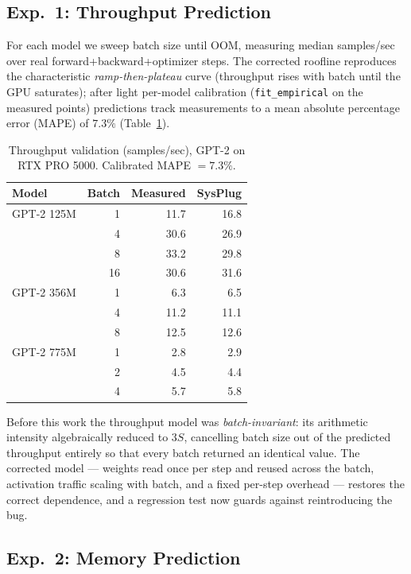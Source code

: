 \documentclass[10pt,twocolumn]{article}
\begin{document}
\subsection{Exp.\ 1: Throughput Prediction}

For each model we sweep batch size until OOM, measuring median samples/sec over
real forward+backward+optimizer steps. The corrected roofline reproduces the
characteristic \emph{ramp-then-plateau} curve (throughput rises with batch until
the GPU saturates); after light per-model calibration (\texttt{fit\_empirical}
on the measured points) predictions track measurements to a mean absolute
percentage error (MAPE) of $7.3\%$ (Table~\ref{tab:tput}).

\begin{table}[h]
\centering
\caption{Throughput validation (samples/sec), GPT-2 on RTX PRO 5000.
Calibrated MAPE $=7.3\%$.}
\label{tab:tput}
\begin{tabular}{lrrr}
\toprule
Model & Batch & Measured & SysPlug \\
\midrule
GPT-2 125M & 1  & 11.7 & 16.8 \\
           & 4  & 30.6 & 26.9 \\
           & 8  & 33.2 & 29.8 \\
           & 16 & 30.6 & 31.6 \\
GPT-2 356M & 1  & 6.3  & 6.5  \\
           & 4  & 11.2 & 11.1 \\
           & 8  & 12.5 & 12.6 \\
GPT-2 775M & 1  & 2.8  & 2.9  \\
           & 2  & 4.5  & 4.4  \\
           & 4  & 5.7  & 5.8  \\
\bottomrule
\end{tabular}
\end{table}

Before this work the throughput model was \emph{batch-invariant}: its arithmetic
intensity algebraically reduced to $3S$, cancelling batch size out of the
predicted throughput entirely so that every batch returned an identical value.
The corrected model --- weights read once per step and reused across the batch,
activation traffic scaling with batch, and a fixed per-step overhead ---
restores the correct dependence, and a regression test now guards against
reintroducing the bug.

\subsection{Exp.\ 2: Memory Prediction}
\end{document}
